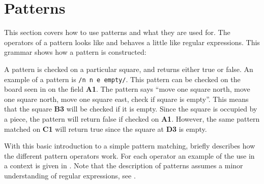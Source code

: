 \section{Patterns}
\label{sec:patterns}

This section covers how to use patterns and what they are used for. The operators
of a pattern looks like and behaves a little like regular expressions. This
grammar shows how a pattern is constructed:

\begin{ebnf}
\end{ebnf}


A pattern is checked on a particular square, and returns either true or false.
An example of a pattern is \texttt{/n n e empty/}. This pattern can be checked on
the board seen in  on the field \textbf{A1}. The pattern
says ``move one square north, move one square north, move one square east, check if
square is empty''. This means that the square \textbf{B3} will be checked if it
is empty. Since the square is occupied by a piece, the pattern will return
false if checked on \textbf{A1}. However, the same pattern matched on
\textbf{C1} will return true since the square at \textbf{D3} is empty.


With this basic introduction to a simple pattern matching,
 briefly describes how the different pattern
operators work. For each operator an example of the use in a context is given
in . Note that the description of patterns assumes a
minor understanding of regular expressions, see \cite{regex}\cite{perlRegex}.

